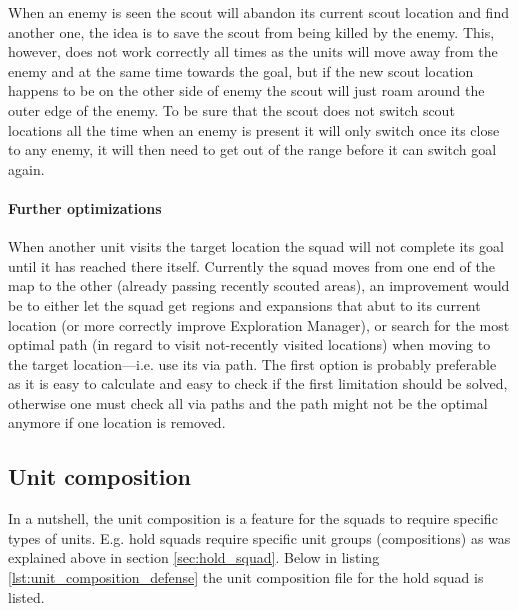 When an enemy is seen the scout will abandon its current scout location and find another one, the idea is to save the scout from being killed by the enemy. This, however, does not work correctly all times as the units will move away from the enemy and at the same time towards the goal, but if the new scout location happens to be on the other side of enemy the scout will just roam around the outer edge of the enemy. To be sure that the scout does not switch scout locations all the time when an enemy is present it will only switch once its close to any enemy, it will then need to get out of the range before it can switch goal again.

\paragraph{Further optimizations}
When another unit visits the target location the squad will not complete its goal until it has reached there itself. Currently the squad moves from one end of the map to the other (already passing recently scouted areas), an improvement would be to either let the squad get regions and expansions that abut to its current location (or more correctly improve Exploration Manager), or search for the most optimal path (in regard to visit not-recently visited locations) when moving to the target location—i.e. use its via path. The first option is probably preferable as it is easy to calculate and easy to check if the first limitation should be solved, otherwise one must check all via paths and the path might not be the optimal anymore if one location is removed.

\subsection{Unit composition}
\label{sec:unit_composition}
In a nutshell, the unit composition is a feature for the squads to require specific types of units. E.g. hold squads require specific unit groups (compositions) as was explained above in section \ref{sec:hold_squad}. Below in listing \ref{lst:unit_composition_defense} the unit composition file for the hold squad is listed.


